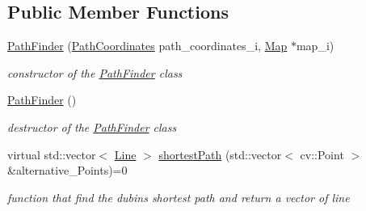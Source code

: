 \subsection*{Public Member Functions}
\begin{DoxyCompactItemize}
\item 
\mbox{\hyperlink{class_path_finder_af9395c561cc945d0f652aef244b3c7b3}{Path\+Finder}} (\mbox{\hyperlink{class_path_coordinates}{Path\+Coordinates}} path\+\_\+coordinates\+\_\+i, \mbox{\hyperlink{class_map}{Map}} $\ast$map\+\_\+i)
\begin{DoxyCompactList}\small\item\em constructor of the \mbox{\hyperlink{class_path_finder}{Path\+Finder}} class \end{DoxyCompactList}\item 
\mbox{\label{class_path_finder_a0761f248c1ebaacf3e47a4021ca25256}} 
\mbox{\hyperlink{class_path_finder_a0761f248c1ebaacf3e47a4021ca25256}{Path\+Finder}} ()
\begin{DoxyCompactList}\small\item\em destructor of the \mbox{\hyperlink{class_path_finder}{Path\+Finder}} class \end{DoxyCompactList}\item 
virtual std\+::vector$<$ \mbox{\hyperlink{class_line}{Line}} $>$ \mbox{\hyperlink{class_path_finder_aee7b3017f8f532f9368d2d996d191a10}{shortest\+Path}} (std\+::vector$<$ cv\+::\+Point $>$ \&alternative\+\_\+\+Points)=0
\begin{DoxyCompactList}\small\item\em function that find the dubins shortest path and return a vector of line \end{DoxyCompactList}\end{DoxyCompactItemize}
